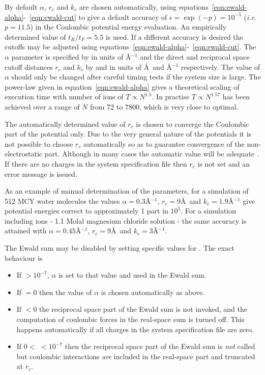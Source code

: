 \documentclass[a4paper,twoside]{report}
\newcommand{\ie}{\emph{i.e.}}
\begin{document}
By default $\alpha$, $r_c$ and $k_c$ are chosen automatically, using
equations~\ref{eqn:ewald-alpha}-~\ref{eqn:ewald-cut} to give a default accuracy of $\epsilon
= \exp(-p) = 10^{-5}$ (\ie\ $p = 11.5$) in the Coulombic potential energy
evaluation.  An empirically determined value of $t_R/t_F = 5.5$ is
used.  If a different accuracy is desired the cutoffs may be adjusted
using equations~\ref{eqn:ewald-alpha}-~\ref{eqn:ewald-cut}.  The $\alpha$ parameter is
specified by  in units of {\AA}$^{-1}$ and the direct and
reciprocal space cutoff distances $r_{c}$ and $k_{c}$ by
 and  in units of {\AA}\ and {\AA}$^{-1}$
respectively.  The value of $\alpha$ should only be changed after
careful timing tests if the system size is large.  The power-law given
in equation~\ref{eqn:ewald-alpha} gives a theoretical scaling of
execution time with number of ions of $T \propto N^{1.5}$. In practise $T
\propto N^{1.57}$ has been achieved over a range of $N$ from 72 to
7800, which is very close to optimal.

 The automatically determined value of $r_c$
is chosen to converge the Coulombic part of the potential only.  Due
to the very general nature of the potentials it is not possible to
choose $r_c$ automatically so as to guarantee convergence of the
non-electrostatic part. Although in many cases the automatic value
will be adequate . If there are no charges in the system
specification file then $r_c$ is not set and an error message is
issued.

As an example of manual determination of the parameters, for a
simulation of 512 MCY water molecules the values $\alpha =
0.3${\AA}$^{-1}$, $r_{c} = 9${\AA}\ and $k_{c} = 1.9${\AA}$^{-1}$ give
potential energies correct to approximately 1 part in $10^{5}$.  For a
simulation including ions - 1.1 Molal magnesium chloride solution -
the same accuracy is attained with $\alpha = 0.45${\AA}$^{-1}$, $r_{c} =
9${\AA}\ and $k_{c} = 3${\AA}$^{-1}$.

The Ewald sum may be disabled by setting specific values for
.  The exact behaviour is
\begin{itemize}
\item If  $ > 10^{-7}$, $\alpha$ is set to that
  value and used in the Ewald sum.
\item If  $ = 0$ then the value of $\alpha$ is
  chosen automatically as above.
\item If  $ < 0$ the reciprocal space part of the
  Ewald sum is not invoked, and the computation of coulombic forces in
  the real-space sum is turned off.  This happens automatically if all 
  charges in the system specification file are zero.
\item If $0 < $  $ < 10^{-7}$ then the reciprocal
  space part of the Ewald sum is \emph{not} called but coulombic
  interactions \emph{are} included in the real-space part and truncated
  at $r_c$.
\end{itemize}
\end{document}
